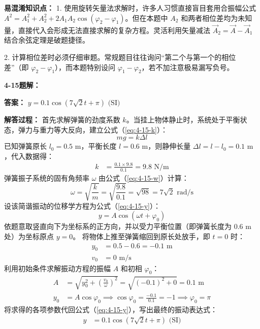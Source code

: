 \textbf{易混淆知识点： }
1. 使用旋转矢量法求解时，许多人习惯直接盲目套用合振幅公式 $A^2 = A_1^2 + A_2^2 + 2A_1A_2\cos(\varphi_2 - \varphi_1)$。但在本题中 $A_2$ 和两者相位差均为未知量，直接代入会形成无法直接求解的复杂方程。灵活利用矢量减法 $\vec{A}_2 = \vec{A} - \vec{A}_1$ 结合余弦定理是破题捷径。

2. 计算相位差时必须仔细审题。常规题目往往询问“第二个与第一个的相位差”（即 $\varphi_2 - \varphi_1$），而本题特别设问 $\varphi_1 - \varphi_2$，若不加注意极易漏写负号。

\vspace{2em}

\textbf{4-15题解： }
\setcounter{equation}{0}
\renewcommand{\theHequation}{4-15.\arabic{equation}}

\textbf{答案： }
$y = 0.1\cos(7\sqrt{2}t + \pi)\text{ (SI)}$

\textbf{解答过程： }
首先求解弹簧的劲度系数 $k$。当挂上物体静止时，系统处于平衡状态，弹力与重力等大反向，建立公式（\ref{eq:4-15-k}）：
\begin{equation}\label{eq:4-15-k}
	mg = k\Delta l
\end{equation}
已知弹簧原长 $l_0 = 0.5\text{ m}$，平衡长度 $l = 0.6\text{ m}$，则静伸长量 $\Delta l = l - l_0 = 0.1\text{ m}$，代入数据得：
\begin{align*}
	k &= \frac{0.1 \times 9.8}{0.1} = 9.8\text{ N/m}
\end{align*}
弹簧振子系统的固有角频率 $\omega$ 由公式（\ref{eq:4-15-w}）计算：
\begin{equation}\label{eq:4-15-w}
	\omega = \sqrt{\frac{k}{m}} = \sqrt{\frac{9.8}{0.1}} = \sqrt{98} = 7\sqrt{2}\text{ rad/s}
\end{equation}
设该简谐振动的位移学方程为公式（\ref{eq:4-15-y}）：
\begin{equation}\label{eq:4-15-y}
	y = A\cos(\omega t + \varphi_0)
\end{equation}
依题意取竖直向下为坐标系的正方向，并以受力平衡位置（即弹簧长度为 $0.6\text{ m}$ 处）为坐标原点 $y=0$。
将物体上推至弹簧缩回到原长处放手，即 $t=0$ 时：
\begin{align*}
	y_0 &= 0.5 - 0.6 = -0.1\text{ m} \\
	v_0 &= 0\text{ m/s}
\end{align*}
利用初始条件求解振动方程的振幅 $A$ 和初相 $\varphi_0$：
\begin{align*}
	A &= \sqrt{y_0^2 + \left(\frac{v_0}{\omega}\right)^2} = \sqrt{(-0.1)^2 + 0} = 0.1\text{ m} \\
	y_0 &= A\cos\varphi_0 \implies \cos\varphi_0 = \frac{-0.1}{0.1} = -1 \implies \varphi_0 = \pi
\end{align*}
将求得的各项参数代回公式（\ref{eq:4-15-y}），写出最终的振动表达式：
\begin{align*}
	y &= 0.1\cos(7\sqrt{2}t + \pi)\text{ (SI)}
\end{align*}


